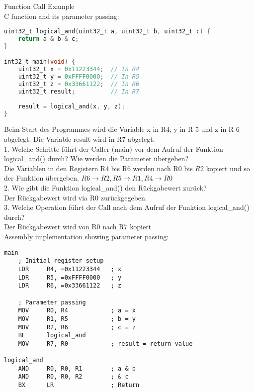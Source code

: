 \begin{example2}{Function Call Example}\\
C function and its parameter passing:

\begin{lstlisting}[language=C, style=basesmol]
uint32_t logical_and(uint32_t a, uint32_t b, uint32_t c) {
    return a & b & c;
}

int32_t main(void) {
    uint32_t x = 0x11223344;  // In R4
    uint32_t y = 0xFFFF0000;  // In R5
    uint32_t z = 0x33661122;  // In R6
    uint32_t result;          // In R7
    
    result = logical_and(x, y, z);
}
\end{lstlisting}

Beim Start des Programmes wird die Variable x in R4, y in R 5 und z in R 6 abgelegt. Die Variable result wird in R7 abgelegt.
\vspace{1mm}\\
1. Welche Schritte führt der Caller (main) vor dem Aufruf der Funktion logical\_and() durch? Wie werden die Parameter übergeben?\\
Die Variablen in den Registern R4 bis R6 werden nach R0 bis $R 2$ kopiert und so der Funktion übergeben. $R 6 \rightarrow R 2, R 5 \rightarrow R 1, R 4 \rightarrow R 0$ 
\vspace{1mm}\\
2. Wie gibt die Funktion logical\_and() den Rückgabewert zurück?\\
Der Rückgabewert wird via R0 zurückgegeben.
\vspace{1mm}\\
3. Welche Operation führt der Call nach dem Aufruf der Funktion logical\_and() durch?\\
Der Rückgabewert wird von R0 nach R7 kopiert
\vspace{1mm}\\
Assembly implementation showing parameter passing:
\begin{lstlisting}[language=armasm, style=basesmol]
main
    ; Initial register setup
    LDR     R4, =0x11223344   ; x
    LDR     R5, =0xFFFF0000   ; y
    LDR     R6, =0x33661122   ; z
    
    ; Parameter passing
    MOV     R0, R4            ; a = x
    MOV     R1, R5            ; b = y
    MOV     R2, R6            ; c = z
    BL      logical_and       
    MOV     R7, R0            ; result = return value

logical_and
    AND     R0, R0, R1        ; a & b
    AND     R0, R0, R2        ; & c
    BX      LR                ; Return
\end{lstlisting}
\end{example2}

